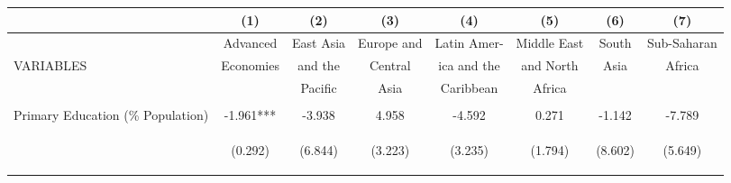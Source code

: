 \begin{subtables}
\begin{landscape}
\begin{table}[htpb!]															
\begin{center}															
\begin{tabular}{lccccccc}	\toprule														
	&	(1)	&	(2)	&	(3)	&	(4)	&	(5)	&	(6)	&	(7)	\\ \midrule
	&	Advanced 	&	East Asia 	&	Europe and 	&	Latin Amer- 	&	Middle East	&	South	&	Sub-Saharan	\\
VARIABLES&	Economies	&	and the 	&	Central 	&	ica and the		&	and North	&	Asia	&	Africa	\\
	&			&	Pacific		&	Asia		&	Caribbean	&	Africa		&		&		\\ \midrule
\vspace{4pt}	&	\begin{footnotesize}\end{footnotesize}	&	\begin{footnotesize}\end{footnotesize}	&	\begin{footnotesize}\end{footnotesize}	&	\begin{footnotesize}\end{footnotesize}	&	\begin{footnotesize}\end{footnotesize}	&	\begin{footnotesize}\end{footnotesize}	&	\begin{footnotesize}\end{footnotesize}	\\
Primary Education (\% Population)	&	-1.961***	&	-3.938	&	4.958	&	-4.592	&	0.271	&	-1.142	&	-7.789	\\
	& \begin{footnotesize}	(0.292)	\end{footnotesize} & \begin{footnotesize}	(6.844)	\end{footnotesize} & \begin{footnotesize}	(3.223)	\end{footnotesize} & \begin{footnotesize}	(3.235)	\end{footnotesize} & \begin{footnotesize}	(1.794)	\end{footnotesize} & \begin{footnotesize}	(8.602)	\end{footnotesize} & \begin{footnotesize}	(5.649)	\end{footnotesize} \\

\end{tabular}
\end{center}
\end{table}
\end{landscape}
\end{subtables}
